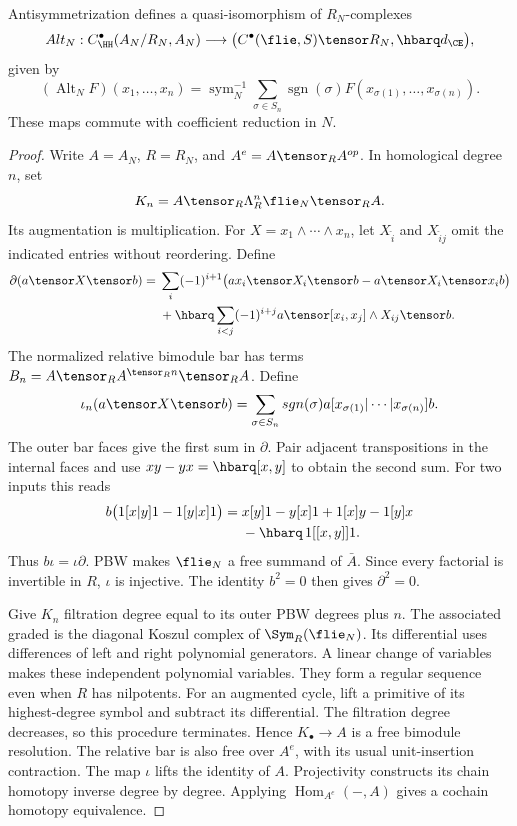 \begin{theorem}\label{thm:vol2-relative-rees}
Antisymmetrization defines a quasi-isomorphism of $R_N$-complexes
\[
 \operatorname{Alt}_N:
 C^\bullet_{\HH}(A_N/R_N,A_N)
 \longrightarrow
 \bigl(C^\bullet(\flie,S)\tensor R_N,\hbarq d_{\CE}\bigr),
\]
given by
\[
 (\operatorname{Alt}_NF)(x_1,\ldots,x_n)
 =\operatorname{sym}_N^{-1}
 \sum_{\sigma\in S_n}\operatorname{sgn}(\sigma)
 F(x_{\sigma(1)},\ldots,x_{\sigma(n)}).
\]
These maps commute with coefficient reduction in $N$.
\end{theorem}
\begin{proof}
Write $A=A_N$, $R=R_N$, and $A^e=A\tensor_R A^{\op}$.
In homological degree $n$, set
\[
 K_n=A\tensor_R\Lambda_R^n\flie_N\tensor_R A.
\]
Its augmentation is multiplication.
For $X=x_1\wedge\cdots\wedge x_n$, let $X_{\widehat i}$ and
$X_{\widehat i\widehat j}$ omit the indicated entries without reordering.
Define
\[
\begin{split}
 \partial(a\tensor X\tensor b)
 ={}&\sum_i(-1)^{i+1}
 \bigl(ax_i\tensor X_{\widehat i}\tensor b
       -a\tensor X_{\widehat i}\tensor x_i b\bigr)\\
 &+\hbarq\sum_{i<j}(-1)^{i+j}
 a\tensor[x_i,x_j]\wedge X_{\widehat i\widehat j}\tensor b.
\end{split}
\]
The normalized relative bimodule bar has terms
$\mathcal B_n=A\tensor_R\bar A^{\tensor_R n}\tensor_R A$.
Define
\[
 \iota_n(a\tensor X\tensor b)
 =\sum_{\sigma\in S_n}\operatorname{sgn}(\sigma)
       a[x_{\sigma(1)}|\cdots|x_{\sigma(n)}]b.
\]
The outer bar faces give the first sum in $\partial$.
Pair adjacent transpositions in the internal faces and use
$xy-yx=\hbarq[x,y]$ to obtain the second sum.
For two inputs this reads
\[
\begin{split}
 b\bigl(1[x|y]1-1[y|x]1\bigr)
 ={}&x[y]1-y[x]1+1[x]y-1[y]x\\
 &-\hbarq\,1[[x,y]]1.
\end{split}
\]
Thus $b\iota=\iota\partial$.
PBW makes $\flie_N$ a free summand of $\bar A$.
Since every factorial is invertible in $R$, $\iota$ is injective.
The identity $b^2=0$ then gives $\partial^2=0$.

Give $K_n$ filtration degree equal to its outer PBW degrees plus $n$.
The associated graded is the diagonal Koszul complex of
$\Sym_R(\flie_N)$.
Its differential uses differences of left and right polynomial generators.
A linear change of variables makes these independent polynomial variables.
They form a regular sequence even when $R$ has nilpotents.
For an augmented cycle, lift a primitive of its highest-degree symbol
and subtract its differential.
The filtration degree decreases, so this procedure terminates.
Hence $K_\bullet\to A$ is a free bimodule resolution.
The relative bar is also free over $A^e$, with its usual unit-insertion contraction.
The map $\iota$ lifts the identity of $A$.
Projectivity constructs its chain homotopy inverse degree by degree.
Applying $\operatorname{Hom}_{A^e}(-,A)$ gives a cochain homotopy equivalence.


\end{proof}
